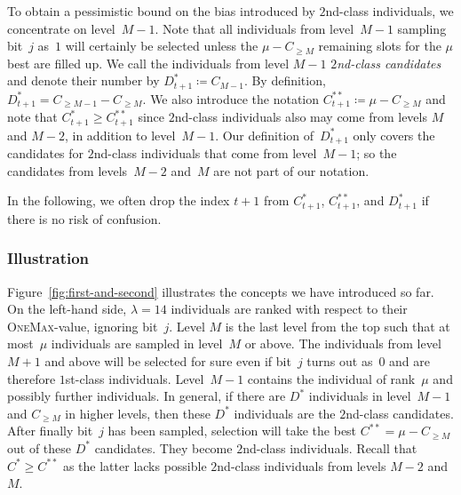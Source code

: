 \documentclass[11pt, a4paper]{article}
\newcommand*{\om}{\textsc{OneMax}\xspace}
\newcommand*{\OneMax}{\om}
\newcommand*{\cumulC}[1]{C_{\geq #1}}
\begin{document}
To obtain 
a pessimistic bound on the bias introduced by $2$nd-class individuals, we concentrate on 
level~$M-1$. Note that all individuals from level~$M-1$ sampling bit~$j$ as~$1$ 
will certainly be selected unless the $\mu-\cumulC{M}$ remaining slots for the $\mu$ best 
are filled up. 
We call the individuals from level 
$M-1$ \emph{$2$nd-class candidates} 
and denote their number by $D^*_{t+1}\coloneqq C_{M-1}$. By definition, $D^*_{t+1} = \cumulC{M-1}-\cumulC{M}$. 
We also introduce the notation $C^{**}_{t+1}\coloneqq \mu-\cumulC{M}$  and note that 
$C^*_{t+1}\ge C^{**}_{t+1}$ since $2$nd-class individuals also may come from levels $M$ and $M-2$, 
in addition to level~$M-1$. Our definition of~$D^*_{t+1}$ only covers the candidates for $2$nd-class individuals 
that come from level~$M-1$; so the candidates from levels~$M-2$ and~$M$ are not part of our notation.

In the following, we often drop the index $t+1$ from $C^*_{t+1}$, $C^{**}_{t+1}$, and $D^*_{t+1}$ if 
there is no risk of confusion.

\subsubsection*{Illustration}

Figure~\ref{fig:first-and-second} illustrates the concepts we have introduced so far. On the 
left-hand side, $\lambda=14$ individuals are ranked with respect to their \OneMax-value, ignoring bit~$j$. 
Level $M$ is the last level from the top such that at most~$\mu$ individuals are sampled in level~$M$ 
or above. The individuals from level $M+1$ and above will be selected for sure even if bit~$j$ turns 
out as~$0$ and are therefore $1$st-class individuals. 
Level~$M-1$ contains the individual of rank~$\mu$ and possibly further individuals. In general, 
if there are $D^*$ individuals in level~$M-1$ and $C_{\ge M}$ in higher levels, then these $D^*$ 
individuals are  the $2$nd-class candidates. After finally bit~$j$ has been sampled, selection 
will take the best $C^{**} = \mu-C_{\ge M}$ out of these $D^*$ candidates. They become 
$2$nd-class individuals. Recall that $C^*\ge C^{**}$ as the latter lacks possible $2$nd-class individuals 
from levels $M-2$ and $M$.
\end{document}
